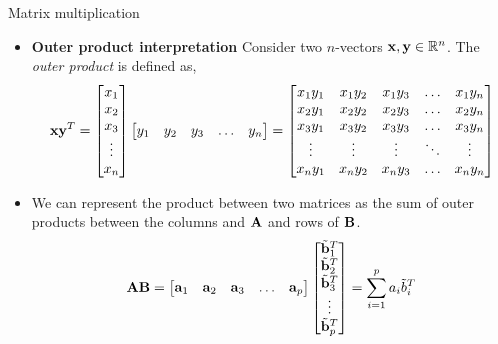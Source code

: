 \documentclass[aspectratio=169]{beamer}
\def\mf{\ensuremath\mathbf}
\begin{document}
\begin{frame}[t]{Matrix multiplication}
\begin{small}
\begin{itemize}
    \item \textbf{Outer product interpretation} Consider two $n$-vectors $\mf{x}, \mf{y} \in \mathbb{R}^n$. The \textit{outer product} is defined as,
    \[ \mf{x}\mf{y}^T = \begin{bmatrix}
    x_1\\ x_2\\ x_3\\ \vdots \\x_n
    \end{bmatrix} \begin{bmatrix}
    y_1 &  y_2 & y_3 & \ldots & y_n
    \end{bmatrix} = \begin{bmatrix}
    x_1y_1 &  x_1y_2 & x_1y_3 & \ldots & x_1y_n \\
    x_2y_1 &  x_2y_2 & x_2y_3 & \ldots & x_2y_n \\
    x_3y_1 &  x_3y_2 & x_3y_3 & \ldots & x_3y_n \\
    \vdots &  \vdots & \vdots & \ddots & \vdots \\
    x_ny_1 &  x_ny_2 & x_ny_3 & \ldots & x_ny_n \\
    \end{bmatrix} \]
    \item We can represent the product between two matrices as the sum of outer products between the columns and $\mf{A}$ and rows of $\mf{B}$. 
    \[ \mf{A}\mf{B} = \begin{bmatrix}
    \mf{a}_1 & \mf{a}_2 & \mf{a}_3 & \ldots & \mf{a}_p
    \end{bmatrix} \begin{bmatrix}
    \tilde{\mf{b}}_1^T \\
    \tilde{\mf{b}}_2^T \\
    \tilde{\mf{b}}_3^T \\
    \vdots \\
    \tilde{\mf{b}}_p^T
    \end{bmatrix} = \sum_{i=1}^{p}a_i\tilde{b}_i^T \]
\end{itemize}
\end{small}
\end{frame}
\end{document}
